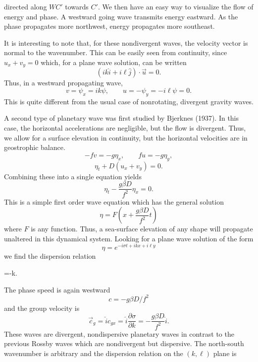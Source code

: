 \sourcepagebreak

directed along $WC'$ towards $C'$. We then have an easy way to visualize the flow of
energy and phase. A westward going wave transmits energy eastward. As the phase
propagates more northwest, energy propagates more southeast.

It is interesting to note that, for these nondivergent waves, the velocity vector is
normal to the wavenumber. This can be easily seen from continuity, since $u_x+v_y=0$
which, for a plane wave solution, can be written
\[
	(ik\hat i+i\ell\hat j)\cdot\vec u=0.
\]
Thus, in a westward propagating wave,
\[
	v=\psi_x=ik\psi,
	\qquad
	u=-\psi_y=-i\ell\psi=0.
\]
This is quite different from the usual case of nonrotating, divergent gravity waves.

A second type of planetary wave was first studied by Bjerknes (1937). In this case, the
horizontal accelerations are negligible, but the flow is divergent. Thus, we allow for
a surface elevation in continuity, but the horizontal velocities are in geostrophic
balance.
\[
	-fv=-g\eta_x,
	\qquad
	fu=-g\eta_y,
\]
\[
	\eta_t+D(u_x+v_y)=0.
\]
Combining these into a single equation yields
\[
	\eta_t-\frac{g\beta D}{f^2}\eta_x=0.
\]
This is a simple first order wave equation which has the general solution
\[
	\eta=F\left(x+\frac{g\beta D}{f^2}t\right)
\]
where $F$ is any function. Thus, a sea-surface elevation of any shape will propagate
unaltered in this dynamical system. Looking for a plane wave solution of the form
\[
	\eta=e^{-i\sigma t+ikx+i\ell y}
\]
we find the dispersion relation
\begin{waveequation}
	\sigma=-k.
\end{waveequation}

\sourcepagebreak

The phase speed is again westward
\[
	c=-g\beta D/f^2
\]
and the group velocity is
\[
	\vec c_g=\hat i c_{gx}=\hat i\frac{\partial\sigma}{\partial k}
	=-\frac{g\beta D}{f^2}\hat i.
\]
These waves are divergent, nondispersive planetary waves in contrast to the previous
Rossby waves which are nondivergent but dispersive. The north-south wavenumber is
arbitrary and the dispersion relation on the $(k,\ell)$ plane is

